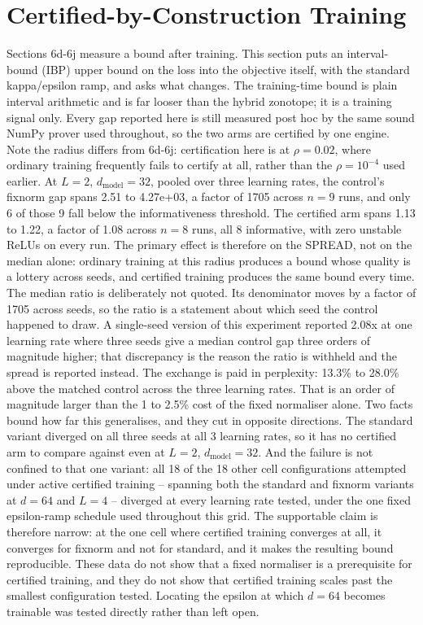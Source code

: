 \documentclass[10pt,journal]{IEEEtran}
\begin{document}
\section{Certified-by-Construction Training}
Sections 6d-6j measure a bound after training. This section puts an interval-bound (IBP) upper bound on the loss into the objective itself, with the standard kappa/epsilon ramp, and asks what changes. The training-time bound is plain interval arithmetic and is far looser than the hybrid zonotope; it is a training signal only. Every gap reported here is still measured post hoc by the same sound NumPy prover used throughout, so the two arms are certified by one engine. Note the radius differs from 6d-6j: certification here is at $\rho=0.02$, where ordinary training frequently fails to certify at all, rather than the $\rho=10^{-4}$ used earlier.
At $L=2$, $d_{\text{model}}=32$, pooled over three learning rates, the control's fixnorm gap spans 2.51 to 4.27e+03, a factor of 1705 across $n=9$ runs, and only 6 of those 9 fall below the informativeness threshold. The certified arm spans 1.13 to 1.22, a factor of 1.08 across $n=8$ runs, all 8 informative, with zero unstable ReLUs on every run. The primary effect is therefore on the SPREAD, not on the median alone: ordinary training at this radius produces a bound whose quality is a lottery across seeds, and certified training produces the same bound every time.
The median ratio is deliberately not quoted. Its denominator moves by a factor of 1705 across seeds, so the ratio is a statement about which seed the control happened to draw. A single-seed version of this experiment reported 2.08x at one learning rate where three seeds give a median control gap three orders of magnitude higher; that discrepancy is the reason the ratio is withheld and the spread is reported instead.
The exchange is paid in perplexity: 13.3\% to 28.0\% above the matched control across the three learning rates. That is an order of magnitude larger than the 1 to 2.5\% cost of the fixed normaliser alone.
Two facts bound how far this generalises, and they cut in opposite directions. The standard variant diverged on all three seeds at all 3 learning rates, so it has no certified arm to compare against even at $L=2$, $d_{\text{model}}=32$. And the failure is not confined to that one variant: all 18 of the 18 other cell configurations attempted under active certified training -- spanning both the standard and fixnorm variants at $d=64$ and $L=4$ -- diverged at every learning rate tested, under the one fixed epsilon-ramp schedule used throughout this grid. The supportable claim is therefore narrow: at the one cell where certified training converges at all, it converges for fixnorm and not for standard, and it makes the resulting bound reproducible. These data do not show that a fixed normaliser is a prerequisite for certified training, and they do not show that certified training scales past the smallest configuration tested. Locating the epsilon at which $d=64$ becomes trainable was tested directly rather than left open.
\end{document}
